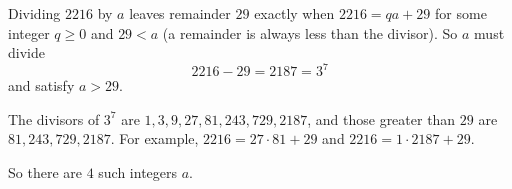 Dividing $2216$ by $a$ leaves remainder $29$ exactly when $2216=qa+29$ for some integer $q\ge0$ and $29<a$ (a remainder is always less than the divisor). So $a$ must divide
\[
2216-29=2187=3^7
\]
and satisfy $a>29$.

The divisors of $3^7$ are $1,3,9,27,81,243,729,2187$, and those greater than $29$ are $81,243,729,2187$. For example, $2216=27\cdot81+29$ and $2216=1\cdot2187+29$.

So there are $\boxed{4}$ such integers $a$.
